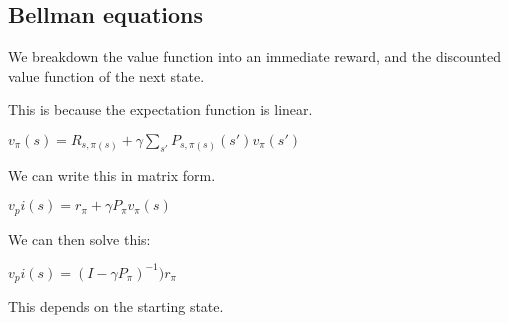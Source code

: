 
\subsection{Bellman equations}

We breakdown the value function into an immediate reward, and the discounted value function of the next state.

This is because the expectation function is linear.

\(v_\pi (s)=R_{s,\pi(s)}+\gamma \sum_{s'}P_{s,\pi(s)}(s')v_\pi (s')\)

We can write this in matrix form.

\(v_pi (s)= r_\pi + \gamma P_\pi v_\pi(s)\)

We can then solve this:

\(v_pi (s)= (I-\gamma P_\pi)^{-1})r_\pi\)

This depends on the starting state.

